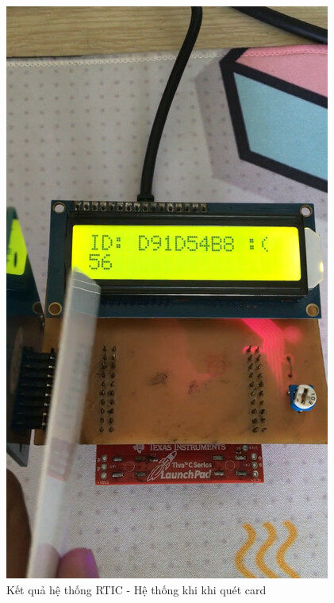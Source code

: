\begin{figure}[ht]
\centering
\includegraphics[scale=0.4]{images/rtic_card.jpg}
\caption{Kết quả hệ thống RTIC - Hệ thống khi khi quét card}
\label{fig:rtic_card}
\end{figure}

